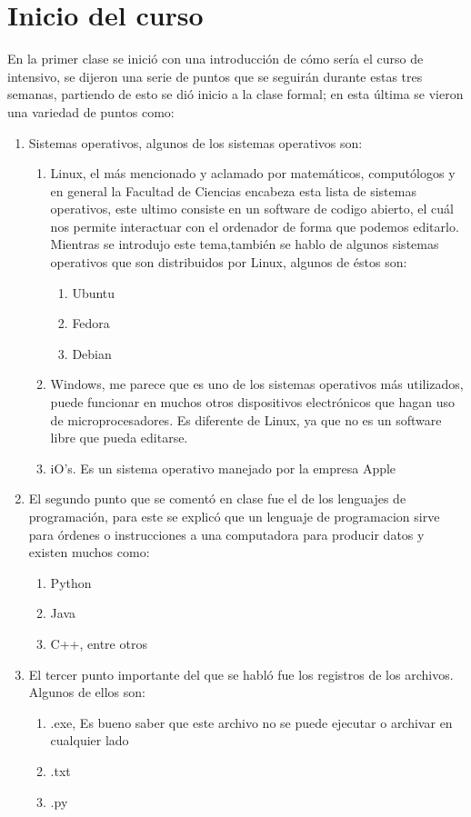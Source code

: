 \documentclass{book}
\begin{document}
	\chapter{Inicio del curso}
		En la primer clase se inició con una introducción de cómo sería el curso de intensivo, se dijeron una serie de puntos que se seguirán durante estas tres semanas, partiendo de esto se dió inicio a la clase formal; en  esta última se vieron una variedad de puntos como:
	\begin{enumerate}
		\item
		Sistemas operativos, algunos de los sistemas operativos son:
		\begin{enumerate}
			\item 
			Linux, el más mencionado y aclamado por matemáticos, computólogos y en general la Facultad de Ciencias encabeza esta lista de sistemas operativos, este ultimo consiste en un software de codigo abierto, el cuál nos permite interactuar con el ordenador de forma que podemos editarlo. Mientras se introdujo este tema,también se hablo de algunos sistemas operativos que son distribuidos por Linux, algunos de éstos son:
			\begin{enumerate}
				\item 
				Ubuntu
				\item 
				Fedora
				\item 
				Debian
			\end{enumerate}
			\item 
			Windows, me parece que es uno de los sistemas operativos más utilizados, puede funcionar en muchos otros dispositivos electrónicos que hagan uso de microprocesadores. Es diferente de Linux, ya que no es un software libre que pueda editarse.
			\item
			iO's. Es un sistema operativo manejado por la empresa Apple
		\end{enumerate}
		\item 
		El segundo punto que se comentó en clase fue el de los lenguajes de programación, para este se explicó que un lenguaje de programacion sirve para órdenes o instrucciones a una computadora para producir datos y existen muchos como:
		\begin{enumerate}
			\item 
			Python 
			\item 
			Java
			\item 
			C++, entre otros
		\end{enumerate}
		\item 
		El tercer punto importante del que se habló fue los registros de los archivos. Algunos de ellos son:
		\begin{enumerate}
			\item
			.exe, Es bueno saber que este archivo no se puede ejecutar o archivar en cualquier lado 
			\item 
			.txt
			\item
			.py 


\end{enumerate}
\end{enumerate}
\end{document}
